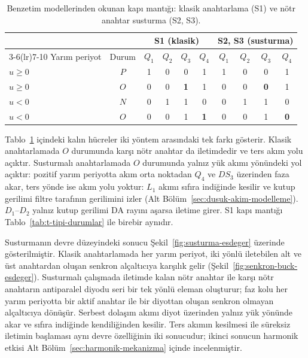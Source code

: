 \begin{table}[htbp]
  \centering
  \caption{Benzetim modellerinden okunan kapı mantığı: klasik anahtarlama (S1) ve nötr anahtar susturma (S2, S3).}
  \label{tab:model-kapi-mantigi}
  \small
  \begin{tabular}{l c c c c c c c c c}
    \toprule
    & & \multicolumn{4}{c}{S1 (klasik)} & \multicolumn{4}{c}{S2, S3 (susturma)} \\
    \cmidrule(lr){3-6}\cmidrule(lr){7-10}
    Yarım periyot & Durum & $Q_1$ & $Q_2$ & $Q_3$ & $Q_4$ & $Q_1$ & $Q_2$ & $Q_3$ & $Q_4$ \\
    \midrule
    $u\geq0$ & $P$ & 1 & 0 & 0 & 1 & 1 & 0 & 0 & 1 \\
    $u\geq0$ & $O$ & 0 & 0 & \textbf{1} & 1 & 0 & 0 & \textbf{0} & 1 \\
    $u<0$ & $N$ & 0 & 1 & 1 & 0 & 0 & 1 & 1 & 0 \\
    $u<0$ & $O$ & 0 & 0 & 1 & \textbf{1} & 0 & 0 & 1 & \textbf{0} \\
    \bottomrule
  \end{tabular}
\end{table}

Tablo~\ref{tab:model-kapi-mantigi} içindeki kalın hücreler iki yöntem arasındaki tek farkı gösterir. Klasik anahtarlamada $O$ durumunda karşı nötr anahtar da iletimdedir ve ters akım yolu açıktır. Susturmalı anahtarlamada $O$ durumunda yalnız yük akımı yönündeki yol açıktır: pozitif yarım periyotta akım orta noktadan $Q_4$ ve $DS_3$ üzerinden faza akar, ters yönde ise akım yolu yoktur: $L_1$ akımı sıfıra indiğinde kesilir ve kutup gerilimi filtre tarafının gerilimini izler (Alt Bölüm~\ref{sec:dusuk-akim-modelleme}). $D_1$--$D_2$ yalnız kutup gerilimi DA rayını aşarsa iletime girer. S1 kapı mantığı Tablo~\ref{tab:t-tipi-durumlar} ile birebir aynıdır.

Susturmanın devre düzeyindeki sonucu Şekil~\ref{fig:susturma-esdeger} üzerinde gösterilmiştir. Klasik anahtarlamada her yarım periyot, iki yönlü iletebilen alt ve üst anahtardan oluşan senkron alçaltıcıya karşılık gelir (Şekil~\ref{fig:senkron-buck-esdeger}). Susturmalı çalışmada iletimde kalan nötr anahtar ile karşı nötr anahtarın antiparalel diyodu seri bir tek yönlü eleman oluşturur; faz kolu her yarım periyotta bir aktif anahtar ile bir diyottan oluşan senkron olmayan alçaltıcıya dönüşür. Serbest dolaşım akımı diyot üzerinden yalnız yük yönünde akar ve sıfıra indiğinde kendiliğinden kesilir. Ters akımın kesilmesi ile süreksiz iletimin başlaması aynı devre özelliğinin iki sonucudur; ikinci sonucun harmonik etkisi Alt Bölüm~\ref{sec:harmonik-mekanizma} içinde incelenmiştir.

